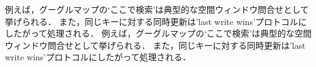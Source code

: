 例えば，グーグルマップの‘ここで検索’は典型的な空間ウィンドウ問合せとして挙げられる．
また，同じキーに対する同時更新は'last write wins'プロトコルにしたがって処理される．
例えば，グーグルマップの‘ここで検索’は典型的な空間ウィンドウ問合せとして挙げられる．
また，同じキーに対する同時更新は'last write wins'プロトコルにしたがって処理される．